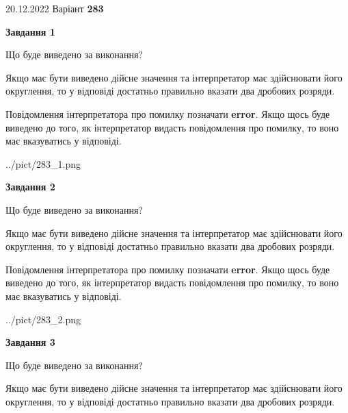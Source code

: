 \documentclass[12pt, ukrainian]{article}
\begin{document}
{20.12.2022 Варіант \No \textbf { 283 }\par}
{
\begin {Large}

{\begin {center}\textbf{Завдання 1}\end {center}}\par
Що буде виведено за виконання? \par

Якщо має бути виведено дійсне значення та інтерпретатор має здійснювати його округлення, 
то у відповіді достатньо правильно вказати два дробових розряди.

Повідомлення інтерпретатора про помилку позначати \textbf{error}.
Якщо щось буде виведено до того, як інтерпретатор видасть повідомлення про помилку, 
то воно має вказуватись у відповіді. \par

\begin{center}
	{../pict/283_1.png}
\end{center}
\newpage

{\begin {center}\textbf{Завдання 2}\end {center}}\par
Що буде виведено за виконання? \par

Якщо має бути виведено дійсне значення та інтерпретатор має здійснювати його округлення, 
то у відповіді достатньо правильно вказати два дробових розряди.

Повідомлення інтерпретатора про помилку позначати \textbf{error}.
Якщо щось буде виведено до того, як інтерпретатор видасть повідомлення про помилку, 
то воно має вказуватись у відповіді. \par

\begin{center}
	{../pict/283_2.png}
\end{center}
\newpage

{\begin {center}\textbf{Завдання 3}\end {center}}\par
Що буде виведено за виконання? \par

Якщо має бути виведено дійсне значення та інтерпретатор має здійснювати його округлення, 
то у відповіді достатньо правильно вказати два дробових розряди.


\end{Large}}
\end{document}
